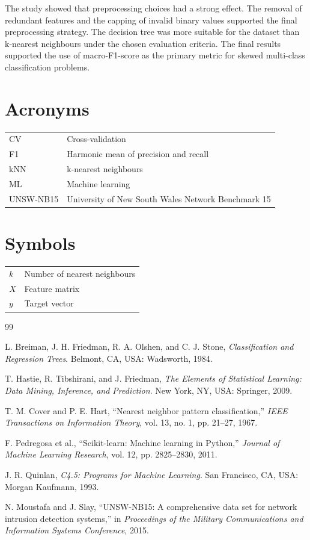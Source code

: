 \documentclass[conference,10pt]{IEEEtran}
\begin{document}
The study showed that preprocessing choices had a strong effect. The removal of redundant features and the capping of invalid binary values supported the final preprocessing strategy. The decision tree was more suitable for the dataset than k-nearest neighbours under the chosen evaluation criteria. The final results supported the use of macro-F1-score as the primary metric for skewed multi-class classification problems.

\newpage

\appendices
\section{Acronyms}
\begin{tabular}{ll}
CV & Cross-validation \\
F1 & Harmonic mean of precision and recall \\
kNN & k-nearest neighbours \\
ML & Machine learning \\
UNSW-NB15 & University of New South Wales Network Benchmark 15 \\
\end{tabular}

\bigskip

\section{Symbols}
\begin{tabular}{ll}
$k$ & Number of nearest neighbours \\
$X$ & Feature matrix \\
$y$ & Target vector \\
\end{tabular}

\bigskip

\begin{thebibliography}{99}

L. Breiman, J. H. Friedman, R. A. Olshen, and C. J. Stone, \textit{Classification and Regression Trees}. Belmont, CA, USA: Wadsworth, 1984.

T. Hastie, R. Tibshirani, and J. Friedman, \textit{The Elements of Statistical Learning: Data Mining, Inference, and Prediction}. New York, NY, USA: Springer, 2009.

T. M. Cover and P. E. Hart, ``Nearest neighbor pattern classification,'' \textit{IEEE Transactions on Information Theory}, vol. 13, no. 1, pp. 21--27, 1967.

F. Pedregosa et al., ``Scikit-learn: Machine learning in Python,'' \textit{Journal of Machine Learning Research}, vol. 12, pp. 2825--2830, 2011.

J. R. Quinlan, \textit{C4.5: Programs for Machine Learning}. San Francisco, CA, USA: Morgan Kaufmann, 1993.

N. Moustafa and J. Slay, ``UNSW-NB15: A comprehensive data set for network intrusion detection systems,'' in \textit{Proceedings of the Military Communications and Information Systems Conference}, 2015.

\end{thebibliography}
\end{document}
